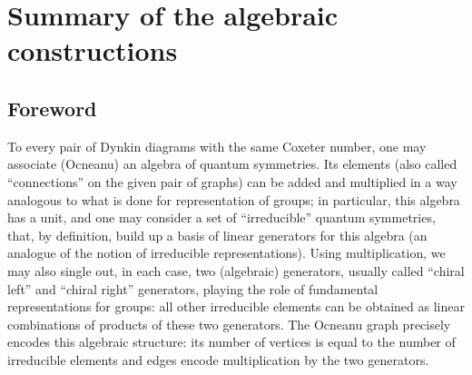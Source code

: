 \documentclass[a4paper,11pt]{article}
\let\sect=\section
\def\section{\newpage\sect}
\begin{document}
\section{Summary of the algebraic constructions}
\subsection{Foreword}
To every pair of \coordHE{} Dynkin diagrams with the same Coxeter number,
one may associate (Ocneanu) an algebra of quantum symmetries. Its
elements (also called ``connections'' on the given pair of graphs) can
be added and multiplied in a way analogous to what is done for
representation of groups; in particular, this algebra has a unit, and one may
consider
a set of ``irreducible'' quantum symmetries, that, by definition, build up a
basis of linear generators for this algebra (an analogue of the notion
of irreducible representations). Using multiplication, we may also
single out, in each case, two (algebraic) generators, usually called
``chiral left'' and ``chiral right'' generators,  playing the role of
fundamental representations for groups: all other irreducible elements can be
obtained as linear combinations of products of these two
generators. The Ocneanu graph precisely encodes this algebraic
structure: its number of vertices is equal to the number
of irreducible elements and edges encode multiplication by the two
generators.
\end{document}
